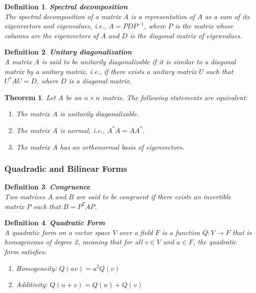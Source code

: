 \documentclass[11pt]{book} %
\newtheorem{theorem}{Theorem}[section]
\newtheorem{definition}{Definition}[section]
\begin{document}
\begin{definition}{\textbf{Spectral decomposition}} \\
    The spectral decomposition of a matrix \( A \) is a representation of \( A \) as a sum of its eigenvectors and eigenvalues, i.e., 
    \( A = PDP^{-1} \), where \( P \) is the matrix whose columns are the eigenvectors of \( A \) and \( D \) is the diagonal matrix of eigenvalues.
\end{definition}

\begin{definition}{\textbf{Unitary diagonalization}} \\
    A matrix \( A \) is said to be unitarily diagonalizable if it is similar to a diagonal matrix by a unitary matrix, i.e., 
    if there exists a unitary matrix \( U \) such that \( U^* A U = D \), where \( D \) is a diagonal matrix.
\end{definition}

\begin{theorem}
    Let \( A \) be an \( n \times n \) matrix. The following statements are equivalent:
    \begin{enumerate}
        \item The matrix \( A \) is unitarily diagonalizable.
        \item The matrix \( A \) is normal, i.e., \( A^* A = A A^* \).
        \item The matrix \( A \) has an orthonormal basis of eigenvectors.
    \end{enumerate}
\end{theorem} 




\subsubsection{Quadradic and Bilinear Forms}

\begin{definition}{\textbf{Congruence}} \\
    Two matrices \( A \) and \( B \) are said to be congruent if there exists an invertible matrix \( P \) such that \( B = P^T A P \).
\end{definition}


\begin{definition}{\textbf{Quadratic Form}} \\
    A quadratic form on a vector space \( V \) over a field \( F \) is a function \( Q: V \to F \) that is homogeneous of degree 2, 
    meaning that for all \( v \in V \) and \( a \in F \), the quadratic form satisfies:
    \begin{enumerate}
        \item Homogeneity: \( Q(av) = a^2 Q(v) \)
        \item Additivity: \( Q(u + v) = Q(u) + Q(v) \)
    \end{enumerate}
\end{definition}
\end{document}
